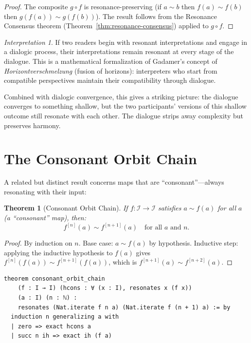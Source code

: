 \documentclass[11pt,openany]{book}
\theoremstyle{definition}
\theoremstyle{plain}
\newtheorem{theorem}[axiom]{Theorem}
\theoremstyle{remark}
\newtheorem{interpretation}[axiom]{Interpretation}
\newcommand{\IS}{\mathcal{I}}               %
\newcommand{\res}{\sim}                      %
\begin{document}
\begin{proof}
The composite $g \circ f$ is resonance-preserving (if $a \res b$ then $f(a) \res f(b)$ then $g(f(a)) \res g(f(b))$). The result follows from the Resonance Consensus theorem (Theorem~\ref{thm:resonance-consensus}) applied to $g \circ f$.
\end{proof}

\begin{interpretation}
If two readers begin with resonant interpretations and engage in a dialogic process, their interpretations remain resonant at every stage of the dialogue. This is a mathematical formalization of Gadamer's concept of \emph{Horizontverschmelzung} (fusion of horizons): interpreters who start from compatible perspectives maintain their compatibility through dialogue.

Combined with dialogic convergence, this gives a striking picture: the dialogue converges to something shallow, but the two participants' versions of this shallow outcome still resonate with each other. The dialogue strips away complexity but preserves harmony.
\end{interpretation}

\section{The Consonant Orbit Chain}

A related but distinct result concerns maps that are ``consonant''---always resonating with their input:

\begin{theorem}[Consonant Orbit Chain]
\label{thm:consonant-chain}
If $f : \IS \to \IS$ satisfies $a \res f(a)$ for all $a$ (a ``consonant'' map), then:
\[
f^{[n]}(a) \res f^{[n+1]}(a) \quad \text{for all } a \text{ and } n.
\]
\end{theorem}

\begin{proof}
By induction on $n$. Base case: $a \res f(a)$ by hypothesis. Inductive step: applying the inductive hypothesis to $f(a)$ gives $f^{[n]}(f(a)) \res f^{[n+1]}(f(a))$, which is $f^{[n+1]}(a) \res f^{[n+2]}(a)$.
\end{proof}

\begin{lstlisting}
theorem consonant_orbit_chain
    (f : I → I) (hcons : ∀ (x : I), resonates x (f x))
    (a : I) (n : ℕ) :
    resonates (Nat.iterate f n a) (Nat.iterate f (n + 1) a) := by
  induction n generalizing a with
  | zero => exact hcons a
  | succ n ih => exact ih (f a)
\end{lstlisting}
\end{document}
